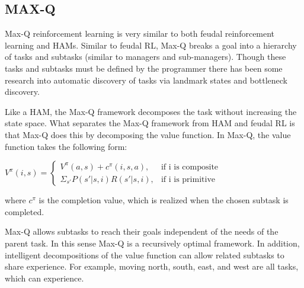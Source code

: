 \subsection{MAX-Q}
Max-Q reinforcement learning \cite{Dietterich} is very similar to both feudal reinforcement learning and
HAMs. Similar to feudal RL, Max-Q breaks a goal into a hierarchy of tasks
and subtasks (similar to managers and sub-managers). Though these tasks and
subtasks must be defined by the programmer there has been some research into
automatic discovery of tasks via landmark states and bottleneck discovery.

Like a HAM, the Max-Q framework decomposes the task without increasing
the state space. What separates the Max-Q framework from HAM and feudal
RL is that Max-Q does this by decomposing the value function.
In Max-Q, the value function takes the following form:

\begin{math}
V^{\pi}(i, s) =
\begin{cases}
V^{\pi}(a, s) + c^{\pi}(i, s, a), & \text{if i is composite}\\
\Sigma_{s'}P(s'|s, i)R(s'|s, i), & \text{if i is primitive}
\end{cases}
\end{math}

where $c^{\pi}$ is the completion value, which is realized when the chosen
subtask is completed.

Max-Q allows subtasks to reach their goals independent of the needs of the parent task.
In this sense Max-Q is a recursively optimal framework. In addition, intelligent decompositions
of the value function can allow related subtasks to share experience. For example,
moving north, south, east, and west are all tasks, which can experience.

